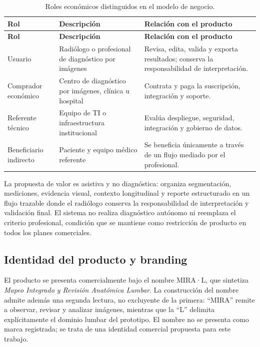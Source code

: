 {\scriptsize
\setlength{\LTleft}{0pt}
\setlength{\LTright}{0pt}
\setlength{\tabcolsep}{3pt}
\renewcommand{\arraystretch}{1.18}
\begin{longtable}{>{\raggedright\arraybackslash}p{} >{\raggedright\arraybackslash}p{} >{\raggedright\arraybackslash}p{}}
\caption{Roles económicos distinguidos en el modelo de negocio.}\label{tab:mn-roles}\\
\hline
\textbf{Rol} & \textbf{Descripción} & \textbf{Relación con el producto} \\
\hline
\endfirsthead
\hline
\textbf{Rol} & \textbf{Descripción} & \textbf{Relación con el producto} \\
\hline
\endhead
\hline
\endfoot
Usuario & Radiólogo o profesional de diagnóstico por imágenes & Revisa, edita, valida y exporta resultados; conserva la responsabilidad de interpretación. \\
Comprador económico & Centro de diagnóstico por imágenes, clínica u hospital & Contrata y paga la suscripción, integración y soporte. \\
Referente técnico & Equipo de TI o infraestructura institucional & Evalúa despliegue, seguridad, integración y gobierno de datos. \\
Beneficiario indirecto & Paciente y equipo médico referente & Se beneficia únicamente a través de un flujo mediado por el profesional. \\
\hline
\end{longtable}
}

La propuesta de valor es asistiva y no diagnóstica: organiza segmentación, mediciones, evidencia visual, contexto longitudinal y reporte estructurado en un flujo trazable donde el radiólogo conserva la responsabilidad de interpretación y validación final. El sistema no realiza diagnóstico autónomo ni reemplaza el criterio profesional, condición que se mantiene como restricción de producto en todos los planes comerciales.

\subsection{Identidad del producto y branding}
\label{sec:mn-branding}

El producto se presenta comercialmente bajo el nombre MIRA·L, que sintetiza \textit{Mapeo Integrado y Revisión Anatómica Lumbar}. La construcción del nombre admite además una segunda lectura, no excluyente de la primera: \enquote{MIRA} remite a observar, revisar y analizar imágenes, mientras que la \enquote{L} delimita explícitamente el dominio lumbar del prototipo. El nombre no se presenta como marca registrada; se trata de una identidad comercial propuesta para este trabajo.

